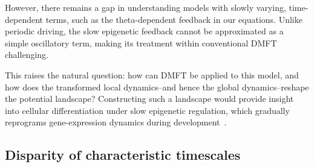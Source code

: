 \documentclass[reprint,amsmath,amssymb,aps]{revtex4-2}
\begin{document}
However, there remains a gap in understanding models with slowly varying, time-dependent terms, such as the theta-dependent feedback in our equations. Unlike periodic driving, the slow epigenetic feedback cannot be approximated as a simple oscillatory term, making its treatment within conventional DMFT challenging.

This raises the natural question: how can DMFT be applied to this model, and how does the transformed local dynamics--and hence the global dynamics--reshape the potential landscape? Constructing such a landscape would provide insight into cellular differentiation under slow epigenetic regulation, which gradually reprograms gene-expression dynamics during development~\cite{matsushita2022dynamical,kaneko2007evolution,miyamoto2015pluripotency,KanekoPRR2020}.

\subsection{Disparity of characteristic timescales}%
\label{disparity}





\end{document}
